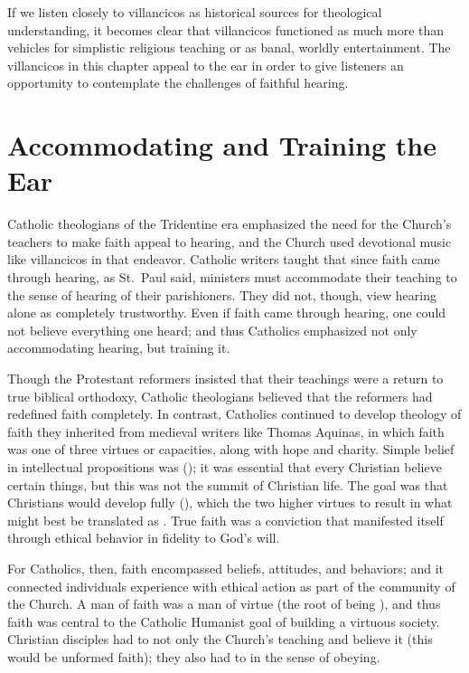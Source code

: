 If we listen closely to villancicos as historical sources for theological 
understanding, it becomes clear that villancicos functioned as much more than 
vehicles for simplistic religious teaching or as banal, worldly entertainment.
The villancicos in this chapter appeal to the ear in order to give listeners an 
opportunity to contemplate the challenges of faithful hearing.

\section{Accommodating and Training the Ear}

Catholic theologians of the Tridentine era emphasized the need for the Church's 
teachers to make faith appeal to hearing, and the Church used devotional music 
like villancicos in that endeavor.
Catholic writers taught that since faith came through hearing, as St.\ Paul 
said, ministers must accommodate their teaching to the sense of hearing of 
their parishioners.
They did not, though, view hearing alone as completely trustworthy.
Even if faith came through hearing, one could not believe everything one heard; 
and thus Catholics emphasized not only accommodating hearing, but training it.

Though the Protestant reformers insisted that their teachings were a return to 
true biblical orthodoxy, Catholic theologians believed that the reformers had 
redefined faith completely.
In contrast, Catholics continued to develop theology of faith they inherited 
from medieval writers like Thomas Aquinas, in which faith was one of three 
virtues or capacities, along with hope and charity.%
    \Autocite[130--132]{Schreiner:Certainty}
Simple belief in intellectual propositions was  
(); it was essential that every Christian believe certain 
things, but this was not the summit of Christian life.
The goal was that Christians would develop fully  
(), which  the two higher virtues to 
result in what might best be translated as .
True faith was a conviction that manifested itself through ethical behavior in 
fidelity to God's will.%
    \Autocite[, 15--20]{Catholic:Catechismus1614}

For Catholics, then, faith encompassed beliefs, attitudes, and behaviors; and 
it connected individuals experience with ethical action as part of the 
community of the Church.
A man of faith was a man of virtue (the root of  being 
), and thus faith was central to the Catholic Humanist goal of 
building a virtuous society.
Christian disciples had to not only  the Church's teaching and 
believe it (this would be unformed faith); they also had to  in 
the sense of obeying.


